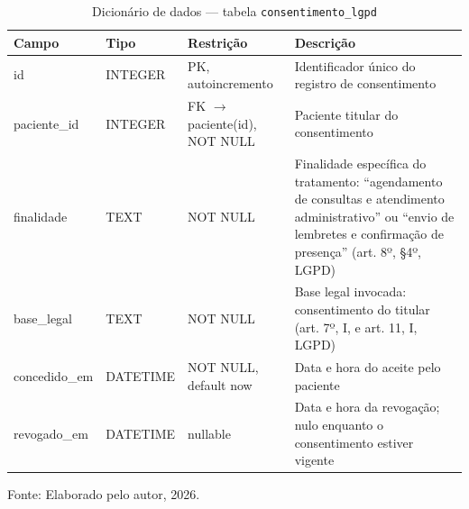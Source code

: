 \documentclass[12pt,a4paper]{extarticle}
\begin{document}
\begin{table}[H]
    \centering
    \caption{Dicionário de dados --- tabela \texttt{consentimento\_\allowbreak{}lgpd}}
    {\small
    \begin{tabularx}{\textwidth}{@{}L{3.3cm} L{1.8cm} L{4.0cm} Y@{}}
        \toprule
        \textbf{Campo} & \textbf{Tipo} & \textbf{Restrição} & \textbf{Descrição} \\
        \midrule
        id & INTEGER & PK, autoincremento & Identificador único do registro de consentimento \\
        paciente\_\allowbreak{}id & INTEGER & FK $\rightarrow$ paciente(id), NOT NULL & Paciente titular do consentimento \\
        finalidade & TEXT & NOT NULL & Finalidade específica do tratamento: ``agendamento de consultas e atendimento administrativo'' ou ``envio de lembretes e confirmação de presença'' (art. 8º, §4º, LGPD) \\
        base\_\allowbreak{}legal & TEXT & NOT NULL & Base legal invocada: consentimento do titular (art. 7º, I, e art. 11, I, LGPD) \\
        concedido\_\allowbreak{}em & DATETIME & NOT NULL, default now & Data e hora do aceite pelo paciente \\
        revogado\_\allowbreak{}em & DATETIME & nullable & Data e hora da revogação; nulo enquanto o consentimento estiver vigente \\
        \bottomrule
    \end{tabularx}
    }
    \vspace{0.12cm}
    {\raggedright\footnotesize Fonte: Elaborado pelo autor, 2026.\par}
\end{table}
\end{document}
